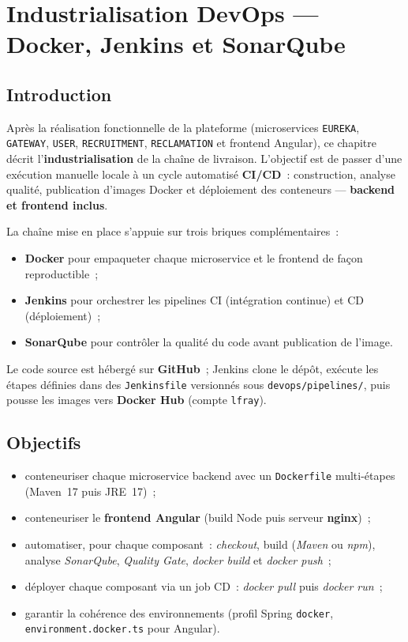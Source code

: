 \chapter{Industrialisation DevOps --- Docker, Jenkins et SonarQube}

\section{Introduction}

Après la réalisation fonctionnelle de la plateforme (microservices
\texttt{EUREKA}, \texttt{GATEWAY}, \texttt{USER}, \texttt{RECRUITMENT},
\texttt{RECLAMATION} et frontend Angular), ce chapitre décrit
l'\textbf{industrialisation} de la chaîne de livraison. L'objectif est de
passer d'une exécution manuelle locale à un cycle automatisé
\textbf{CI/CD}~: construction, analyse qualité, publication d'images Docker
et déploiement des conteneurs --- \textbf{backend et frontend inclus}.

La chaîne mise en place s'appuie sur trois briques complémentaires~:
\begin{itemize}
  \item \textbf{Docker} pour empaqueter chaque microservice et le frontend
        de façon reproductible~;
  \item \textbf{Jenkins} pour orchestrer les pipelines CI (intégration
        continue) et CD (déploiement)~;
  \item \textbf{SonarQube} pour contrôler la qualité du code avant
        publication de l'image.
\end{itemize}

Le code source est hébergé sur \textbf{GitHub}~; Jenkins clone le dépôt,
exécute les étapes définies dans des \texttt{Jenkinsfile} versionnés sous
\texttt{devops/pipelines/}, puis pousse les images vers
\textbf{Docker Hub} (compte \texttt{lfray}).


\section{Objectifs}

\begin{itemize}
  \item conteneuriser chaque microservice backend avec un
        \texttt{Dockerfile} multi-étapes (Maven~17 puis JRE~17)~;
  \item conteneuriser le \textbf{frontend Angular} (build Node puis
        serveur \textbf{nginx})~;
  \item automatiser, pour chaque composant~: \emph{checkout},
        build (\emph{Maven} ou \emph{npm}), analyse \emph{SonarQube},
        \emph{Quality Gate}, \emph{docker build} et \emph{docker push}~;
  \item déployer chaque composant via un job CD~: \emph{docker pull} puis
        \emph{docker run}~;
  \item garantir la cohérence des environnements (profil Spring
        \texttt{docker}, \texttt{environment.docker.ts} pour Angular).
\end{itemize}


